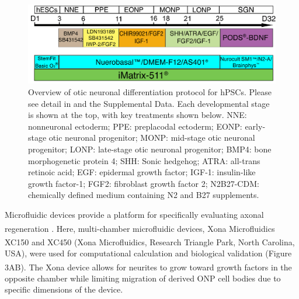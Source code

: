 \documentclass[review]{elsarticle}
\begin{document}
\begin{figure}
	\begin{center}
		\includegraphics[width=12cm]{Fig_2.jpg} %
	\end{center}
	\caption{Overview of otic neuronal differentiation protocol for hPSCs. Please see detail in \cite{Heuer2021, Chang2020,Matsuoka2017g, Matsuoka2017} and the Supplemental Data. Each developmental stage is shown at the top, with key treatments shown below. NNE: nonneuronal ectoderm; PPE: preplacodal ectoderm; EONP: early-stage otic neuronal progenitor; MONP: mid-stage otic neuronal progenitor; LONP: late-stage otic neuronal progenitor; BMP4: bone morphogenetic protein 4; SHH: Sonic hedgehog; ATRA: all-trans retinoic acid; EGF: epidermal growth factor; IGF-1: insulin-like growth factor-1; FGF2: fibroblast growth factor 2; N2B27-CDM: chemically defined medium containing N2 and B27 supplements.}
\end{figure}

Microfluidic devices provide a platform for specifically evaluating axonal regeneration \cite{Al-Ali2017a}. Here, multi-chamber microfluidic devices, Xona\textsuperscript{\texttrademark} Microfluidics XC150 and XC450 (Xona\textsuperscript{\texttrademark} Microfluidics, Research Triangle Park, North Carolina, USA), were used for computational calculation and biological validation (Figure 3A\textendash B). The Xona \textsuperscript{\texttrademark} device allows for neurites to grow toward growth factors in the opposite chamber while limiting migration of derived ONP cell bodies due to specific dimensions of the device. 
\end{document}
